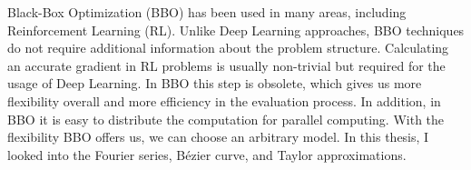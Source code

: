 

Black-Box Optimization (BBO) has been used in many areas, including Reinforcement Learning (RL). Unlike Deep Learning approaches, BBO techniques do not require additional information about the problem structure. Calculating an accurate gradient in RL problems is usually non-trivial but required for the usage of Deep Learning. In BBO this step is obsolete, which gives us more flexibility overall and more efficiency in the evaluation process. In addition, in BBO it is easy to distribute the computation for parallel computing. With the flexibility BBO offers us, we can choose an arbitrary model. In this thesis, I looked into the Fourier series, Bézier curve, and Taylor approximations.
\\
